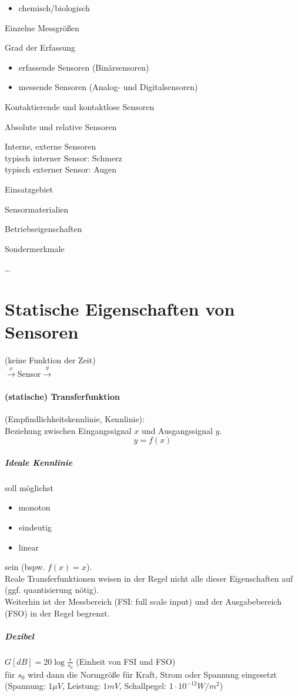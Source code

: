 \documentclass{scrreprt}
\begin{document}
\begin{anumerate}
\begin{itemize}
\item chemisch/biologisch
\end{itemize}
\item Einzelne Messgrößen
\item Grad der Erfassung
\begin{itemize}
\item erfassende Sensoren (Binärsensoren)
\item messende Sensoren (Analog- und Digitalsensoren)
\end{itemize}
\item Kontaktierende und kontaktlose Sensoren
\item Absolute und relative Sensoren
\item Interne, externe Sensoren\\
typisch interner Sensor: Schmerz\\
typisch externer Sensor: Augen
\item Einsatzgebiet
\item Sensormaterialien
\item Betriebseigenschaften
\item Sondermerkmale
\item[] …
\end{anumerate}

\section{Statische Eigenschaften von Sensoren}
(keine Funktion der Zeit)\\
$\overset{x}{\longrightarrow}$Sensor$\overset{y}{\longrightarrow}$
\paragraph{(statische) Transferfunktion} (Empfindlichkeitskennlinie, Kennlinie):\\
Beziehung zwischen Eingangssignal $x$ und Ausgangssignal $y$.
$$\boxed{y=f(x)}$$
\subparagraph{Ideale Kennlinie} soll möglichst
\begin{itemize}
\item monoton
\item eindeutig
\item linear
\end{itemize}
sein (bspw. $f(x)=x$).\\
Reale Transferfunktionen weisen in der Regel nicht alle dieser Eigenschaften auf (ggf. quantisierung nötig).\\
Weiterhin ist der Messbereich (FSI: full scale input) und der Ausgabebereich (FSO) in der Regel begrenzt.
\subparagraph{Dezibel} $G[dB]=20 \log \frac{s}{s_0}$ (Einheit von FSI und FSO)\\
für $s_0$ wird dann die Normgröße für Kraft, Strom oder Spannung eingesetzt (Spannung: $1 \mu V$, Leistung: $1mV$, Schallpegel: $1\cdot 10^{-12}W/m^2$)
\end{document}
